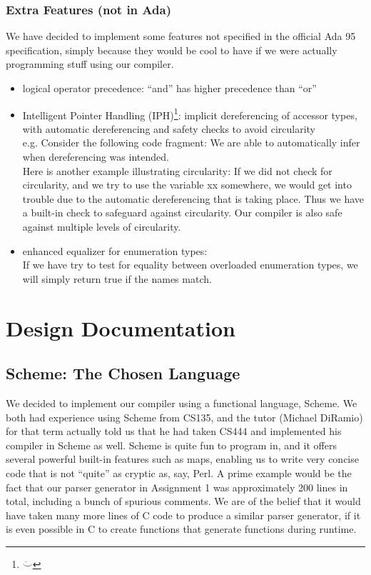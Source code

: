 \documentclass[onecolumn,11pt]{article}
\begin{document}
\subsubsection{Extra Features (not in Ada)}
We have decided to implement some features not specified in the official Ada 95 specification, simply because they would be cool to have if we were actually programming stuff using our compiler.
\begin{itemize}
  \item{logical operator precedence: ``and'' has higher precedence than ``or''}

  \item{Intelligent Pointer Handling (IPH\texttrademark)\footnote{$\ddot \smile$}: implicit dereferencing of accessor types, with automatic dereferencing and safety checks to avoid circularity \\
    e.g. Consider the following code fragment:
    We are able to automatically infer when dereferencing was intended. \\
    Here is another example illustrating circularity: 
    If we did not check for circularity, and we try to use the variable xx somewhere, we would get into trouble due to the automatic dereferencing that is taking place. Thus we have a built-in check to safeguard against circularity. Our compiler is also safe against multiple levels of circularity. \\
  }
  \item{enhanced equalizer for enumeration types: \\
    If we have try to test for equality between overloaded enumeration types, we will simply return true if the names match.
  }
\end{itemize}

\section{Design Documentation}

\subsection{Scheme: The Chosen Language}

We decided to implement our compiler using a functional language, Scheme. We both had experience using Scheme from CS135, and the tutor (Michael DiRamio) for that term actually told us that he had taken CS444 and implemented his compiler in Scheme as well. Scheme is quite fun to program in, and it offers several powerful built-in features such as maps, enabling us to write very concise code that is not ``quite'' as cryptic as, say, Perl. A prime example would be the fact that our parser generator in Assignment 1 was approximately 200 lines in total, including a bunch of spurious comments. We are of the belief that it would have taken many more lines of C code to produce a similar parser generator, if it is even possible in C to create functions that generate functions during runtime. \\
\end{document}
